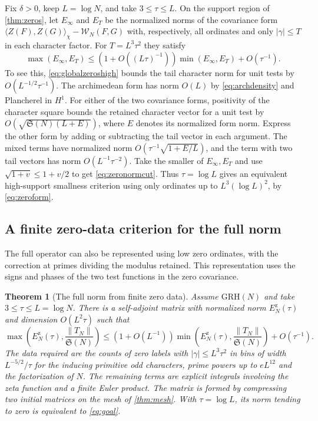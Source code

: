 \documentclass[11pt,a4paper]{article}
\numberwithin{equation}{section}
\newtheorem{theorem}{Theorem}[section]
\newcommand{\SSS}{\mathfrak S}
\newcommand{\grh}{\mathrm{GRH}}
\begin{document}
Fix $\delta>0$, keep $L=\log N$, and take $3\le\tau\le L$.
On the support region of \cref{thm:zeros}, let $E_\infty$
and $E_T$ be the normalized norms of the covariance form
$\langle Z(F),Z(G)\rangle_\chi-\mathcal W_N(F,G)$ with,
respectively, all ordinates and only $|\gamma|\le T$ in each
character factor. For $T=L^3\tau^2$ they satisfy
\begin{equation}
 \max(E_\infty,E_T)\le (1+O((L\tau)^{-1}))\min(E_\infty,E_T)
                               +O(\tau^{-1}).
 \label{eq:zeronormcut}
\end{equation}
To see this, \cref{eq:globalzeroshigh} bounds the tail character
norm for unit tests by $O(L^{-1/2}\tau^{-1})$. The archimedean
form has norm $O(L)$ by \cref{eq:archdensity} and Plancherel in
$H^1$. For either of the two covariance forms, positivity of
the character square bounds the retained character vector
for a unit test by $O(\sqrt{\SSS(N)(L+E)})$, where $E$ denotes
its normalized form norm. Express the other form by adding
or subtracting the tail vector in each argument. The mixed
terms have normalized norm $O(\tau^{-1}\sqrt{1+E/L})$, and
the term with two tail vectors has norm $O(L^{-1}\tau^{-2})$.
Take the smaller of $E_\infty,E_T$ and use
$\sqrt{1+v}\le1+v/2$ to get \cref{eq:zeronormcut}.
Thus $\tau=\log L$ gives an equivalent high-support smallness
criterion using only ordinates up to $L^3(\log L)^2$, by
\cref{eq:zeroform}.

\subsection{A finite zero-data criterion for the full norm}

The full operator can also be represented using low zero
ordinates, with the correction at primes dividing the
modulus retained. This representation uses the signs and
phases of the two test functions in the zero covariance.

\begin{theorem}[The full norm from finite zero data]
\label{thm:fullzerodata}
Assume $\grh(N)$ and take $3\le\tau\le L=\log N$. There is a
self-adjoint matrix with normalized norm $E_N^{\mathrm z}(\tau)$
and dimension $O(L^2\tau)$ such that
\begin{equation}
 \max\!\left(E_N^{\mathrm z}(\tau),\frac{\|T_N\|}{\SSS(N)}\right)
 \le (1+O(L^{-1}))
    \min\!\left(E_N^{\mathrm z}(\tau),\frac{\|T_N\|}{\SSS(N)}\right)
       +O(\tau^{-1}).
 \label{eq:fullzerodata}
\end{equation}
The data required are the counts of zero labels with
$|\gamma|\le L^3\tau^2$ in bins of width $L^{-5/2}/\tau$
for the inducing primitive odd characters, prime powers up
to $e L^{12}$ and the factorization of $N$. The remaining terms
are explicit integrals involving the zeta function and
a finite Euler product. The matrix is formed by compressing
two initial matrices on the mesh of \cref{thm:mesh}. With
$\tau=\log L$, its norm tending to zero is equivalent to
\cref{eq:goal}.
\end{theorem}
\end{document}
